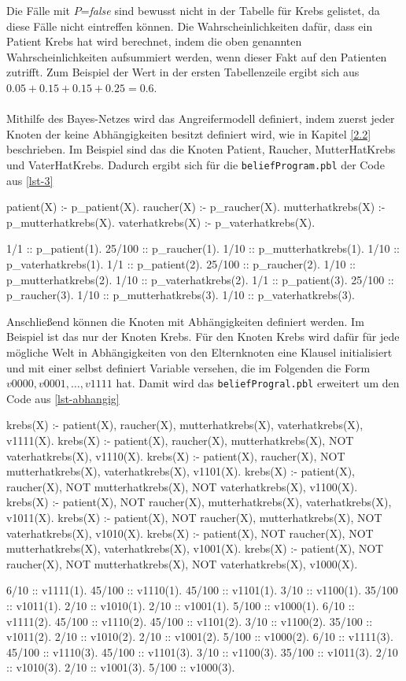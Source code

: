 \documentclass[german,version-2020-11]{uzl-thesis}
\begin{document}
\noindent 
Die Fälle mit $P$=\textit{false} sind bewusst nicht in der Tabelle für Krebs gelistet, da diese Fälle nicht eintreffen können. Die Wahrscheinlichkeiten dafür, dass ein Patient Krebs hat wird berechnet, indem die oben genannten Wahrscheinlichkeiten aufsummiert werden, wenn dieser Fakt auf den Patienten zutrifft. Zum Beispiel der Wert in der ersten Tabellenzeile ergibt sich aus $0.05 + 0.15 + 0.15 +0.25 = 0.6$. \\ \\
Mithilfe des Bayes-Netzes wird das Angreifermodell definiert, indem zuerst jeder Knoten der keine Abhängigkeiten besitzt definiert wird, wie in Kapitel \cref{2.2} beschrieben. Im Beispiel sind das die Knoten Patient, Raucher, MutterHatKrebs und VaterHatKrebs. Dadurch ergibt sich für die \texttt{beliefProgram.pbl} der Code aus \autoref{lst-3}
\begin{Pseudocode}[caption={Beispiel für Knoten ohne Abhängigkeiten }, label={lst-3}, numbers=left]
patient(X) :- p_patient(X).
raucher(X) :- p_raucher(X).
mutterhatkrebs(X) :- p_mutterhatkrebs(X).
vaterhatkrebs(X) :- p_vaterhatkrebs(X).
	
1/1 :: p_patient(1).
25/100 :: p_raucher(1).
1/10 :: p_mutterhatkrebs(1).
1/10 :: p_vaterhatkrebs(1).
1/1 :: p_patient(2).
25/100 :: p_raucher(2).
1/10 :: p_mutterhatkrebs(2).
1/10 :: p_vaterhatkrebs(2).
1/1 :: p_patient(3).
25/100 :: p_raucher(3).
1/10 :: p_mutterhatkrebs(3).
1/10 :: p_vaterhatkrebs(3).
\end{Pseudocode}
Anschließend können die Knoten mit Abhängigkeiten definiert werden. Im Beispiel ist das nur der Knoten Krebs. Für den Knoten Krebs wird dafür für jede mögliche Welt in Abhängigkeiten von den Elternknoten eine Klausel initialisiert und mit einer selbst definiert Variable versehen, die im Folgenden die Form $v0000, v0001, \dots , v1111$ hat. Damit wird das \texttt{beliefProgral.pbl} erweitert um den Code aus \autoref{lst-abhangig} 
\begin{Pseudocode}[caption={Beispiel für Knoten mit Abhängigkeiten }, label={lst-abhangig}, numbers=left]
krebs(X) :- patient(X), raucher(X), mutterhatkrebs(X), vaterhatkrebs(X), v1111(X).
krebs(X) :- patient(X), raucher(X), mutterhatkrebs(X), NOT vaterhatkrebs(X), v1110(X).
krebs(X) :- patient(X), raucher(X), NOT mutterhatkrebs(X), vaterhatkrebs(X), v1101(X).
krebs(X) :- patient(X), raucher(X), NOT mutterhatkrebs(X), NOT vaterhatkrebs(X), v1100(X).
krebs(X) :- patient(X), NOT raucher(X), mutterhatkrebs(X), vaterhatkrebs(X), v1011(X).
krebs(X) :- patient(X), NOT raucher(X), mutterhatkrebs(X), NOT vaterhatkrebs(X), v1010(X).
krebs(X) :- patient(X), NOT raucher(X), NOT mutterhatkrebs(X), vaterhatkrebs(X), v1001(X).
krebs(X) :- patient(X), NOT raucher(X), NOT mutterhatkrebs(X), NOT vaterhatkrebs(X), v1000(X).

6/10 :: v1111(1).
45/100 :: v1110(1).
45/100 :: v1101(1).
3/10 :: v1100(1).
35/100 :: v1011(1).
2/10 :: v1010(1).
2/10 :: v1001(1).
5/100 :: v1000(1).
6/10 :: v1111(2).
45/100 :: v1110(2).
45/100 :: v1101(2).
3/10 :: v1100(2).
35/100 :: v1011(2).
2/10 :: v1010(2).
2/10 :: v1001(2).
5/100 :: v1000(2).
6/10 :: v1111(3).
45/100 :: v1110(3).
45/100 :: v1101(3).
3/10 :: v1100(3).
35/100 :: v1011(3).
2/10 :: v1010(3).
2/10 :: v1001(3).
5/100 :: v1000(3).
\end{Pseudocode}
\end{document}
